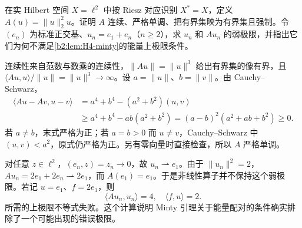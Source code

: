 \begin{exercise}[为什么不能直接通过非线性弱极限]\label{b2:ex:H4-weak-nonlinearity}
在实 Hilbert 空间 \(X=\ell^2\) 中按 Riesz 对应识别 \(X^*=X\)，定义 \(A(u)=\|u\|_2^2u\)。证明 \(A\) 连续、严格单调、把有界集映为有界集且强制。令 \((e_n)\) 为标准正交基、\(u_n=e_1+e_n\)（\(n\ge2\)），求 \(u_n\) 和 \(Au_n\) 的弱极限，并指出它们为何不满足\cref{b2:lem:H4-minty}的能量上极限条件。
\end{exercise}
\begin{solution}
连续性来自范数与数乘的连续性，\(\|Au\|=\|u\|^3\) 给出有界集的像有界，且 \(\langle Au,u\rangle/\|u\|=\|u\|^3\to\infty\)。设 \(a=\|u\|\)、\(b=\|v\|\)。由 Cauchy--Schwarz，
\[
 \begin{aligned}
 \langle Au-Av,u-v\rangle
 &=a^4+b^4-(a^2+b^2)(u,v)\\
 &\ge a^4+b^4-ab(a^2+b^2)
 =(a-b)^2(a^2+ab+b^2)\ge0.
 \end{aligned}
\]
若 \(a\ne b\)，末式严格为正；若 \(a=b>0\) 而 \(u\ne v\)，Cauchy--Schwarz 中 \((u,v)<a^2\)，原式仍严格为正。另有零向量时直接检查，所以 \(A\) 严格单调。

对任意 \(z\in\ell^2\)，\((e_n,z)=z_n\to0\)，故 \(u_n\rightharpoonup e_1\)。由于 \(\|u_n\|^2=2\)，\(Au_n=2e_1+2e_n\rightharpoonup2e_1\)，而 \(A(e_1)=e_1\)。于是非线性算子并不保持这个弱极限。若记 \(u=e_1\)、\(f=2e_1\)，则
\[
 \langle Au_n,u_n\rangle=4,
 \quad\langle f,u\rangle=2.
\]
所需的上极限不等式失败。这个计算说明 Minty 引理关于能量配对的条件确实排除了一个可能出现的错误极限。
\end{solution}
